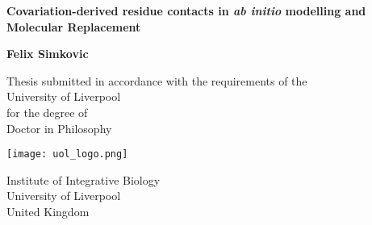 \begin{titlepage}
    \begin{center}
        \vspace*{2cm}
        
        \Huge
        \textbf{Covariation-derived residue contacts in \textit{ab initio} modelling and Molecular Replacement}
        
        \vspace{2.5cm}
        
        \huge
        \textbf{Felix Simkovic}
        
        \vfill
        
        \Large
        Thesis submitted in accordance with the requirements of the \\
        University of Liverpool\\
        for the degree of\\
        Doctor in Philosophy
        
        \vspace{0.8cm}
        
        \texttt{[image: uol\_logo.png]}
        
        \Large
        Institute of Integrative Biology\\
        University of Liverpool\\
        United Kingdom
        
    \end{center}
\end{titlepage}
